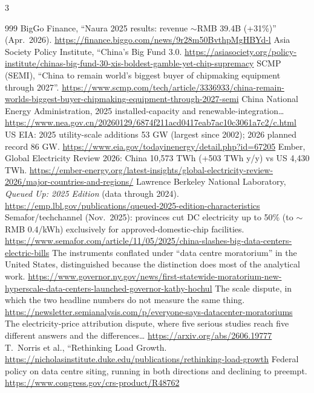\begin{multicols}{3}
\begin{thebibliography}{999}
 BigGo Finance, ``Naura 2025 results: revenue $\sim$RMB 39.4B (+31\%)'' (Apr.\ 2026). \url{https://finance.biggo.com/news/9r28m50BvthpMgHBYd-l}
 Asia Society Policy Institute, ``China's Big Fund 3.0. \url{https://asiasociety.org/policy-institute/chinas-big-fund-30-xis-boldest-gamble-yet-chip-supremacy}
 SCMP (SEMI), ``China to remain world's biggest buyer of chipmaking equipment through 2027''. \url{https://www.scmp.com/tech/article/3336933/china-remain-worlds-biggest-buyer-chipmaking-equipment-through-2027-semi}
 China National Energy Administration, 2025 installed-capacity and renewable-integration… \url{https://www.nea.gov.cn/20260129/6874f211acd0417eab7ac10c3061a7c2/c.html}
 US EIA: 2025 utility-scale additions 53 GW (largest since 2002); 2026 planned record 86 GW. \url{https://www.eia.gov/todayinenergy/detail.php?id=67205}
 Ember, Global Electricity Review 2026: China 10,573 TWh (+503 TWh y/y) vs US 4,430 TWh. \url{https://ember-energy.org/latest-insights/global-electricity-review-2026/major-countries-and-regions/}
 Lawrence Berkeley National Laboratory, \emph{Queued Up: 2025 Edition} (data through 2024). \url{https://emp.lbl.gov/publications/queued-2025-edition-characteristics}
 Semafor/techchannel (Nov.\ 2025): provinces cut DC electricity up to 50\% (to $\sim$RMB 0.4/kWh) exclusively for approved-domestic-chip facilities. \url{https://www.semafor.com/article/11/05/2025/china-slashes-big-data-centers-electric-bills}
 The instruments conflated under ``data centre moratorium'' in the United States, distinguished because the distinction does most of the analytical work. \url{https://www.governor.ny.gov/news/first-statewide-moratorium-new-hyperscale-data-centers-launched-governor-kathy-hochul}
 The scale dispute, in which the two headline numbers do not measure the same thing. \url{https://newsletter.semianalysis.com/p/everyone-says-datacenter-moratoriums}
 The electricity-price attribution dispute, where five serious studies reach five different answers and the differences… \url{https://arxiv.org/abs/2606.19777}
 T.~Norris et al., ``Rethinking Load Growth. \url{https://nicholasinstitute.duke.edu/publications/rethinking-load-growth}
 Federal policy on data centre siting, running in both directions and declining to preempt. \url{https://www.congress.gov/crs-product/R48762}

\end{thebibliography}
\end{multicols}
